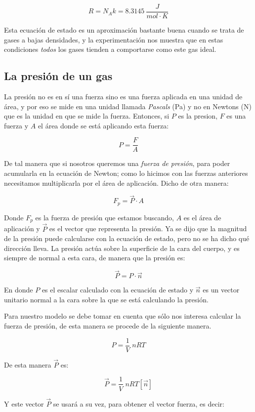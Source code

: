 $$ R = N_A k = 8.3145 \ \frac{J}{mol \cdot K}$$

Esta ecuación de estado es un aproximación bastante buena cuando se trata de gases a bajas densidades, y la experimentación nos muestra que en estas condiciones \emph{todos} los gases tienden a comportarse como este gas ideal.

\subsection{La presión de un gas}

La presión no es en sí una fuerza sino es una fuerza aplicada en una unidad de área, y por eso se mide en una unidad llamada \emph{Pascals} (Pa) y no en Newtons (N) que es la unidad en que se mide la fuerza. Entonces, si $P$ es la presion, $F$ es una fuerza y $A$ el área donde se está aplicando esta fuerza:

$$ P = \frac{F}{A} $$

De tal manera que si nosotros queremos una \emph{fuerza de presión}, para poder acumularla en la ecuación de Newton; como lo hicimos con las fuerzas anteriores necesitamos multiplicarla por el área de aplicación. Dicho de otra manera:

$$ F_p = \vec{P} \cdot A $$

Donde $F_p$ es la fuerza de presión que estamos buscando, $A$ es el área de aplicación y $\vec{P}$ es el vector que representa la presión. Ya se dijo que la magnitud de la presión puede calcularse con la ecuación de estado, pero no se ha dicho qué dirección lleva. La presión actúa sobre la superficie de la cara del cuerpo, y es siempre de normal a esta cara, de manera que la presión es:

$$ \vec{P} = P \cdot \vec{n} $$

En donde $P$ es el escalar calculado con la ecuación de estado y $\vec{n}$ es un vector unitario normal a la cara sobre la que se está calculando la presión.

Para nuestro modelo se debe tomar en cuenta que sólo nos interesa calcular la fuerza de presión, de esta manera se procede de la siguiente manera.

$$ P = \frac{1}{V} \; nRT $$

De esta manera $\vec{P}$ es:

$$ \vec{P} = \frac{1}{V} \; nRT \left[ \vec{n} \right] $$

Y este vector $\vec{P}$ se usará a su vez, para obtener el vector fuerza, es decir:

